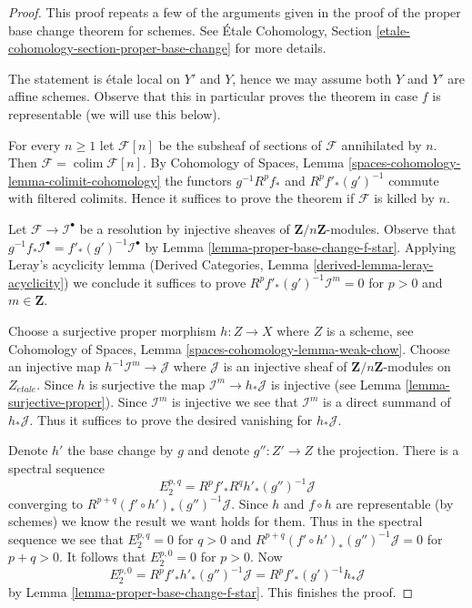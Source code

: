 \documentclass[10pt,a4paper]{amsart}
\theoremstyle{plain}
\theoremstyle{definition}
\theoremstyle{remark}
\numberwithin{equation}{subsection}
\def\colim{\mathop{\mathrm{colim}}\nolimits}
\def\etale{{\acute{e}tale}}
\begin{document}
\begin{proof}
This proof repeats a few of the arguments given in the proof of the
proper base change theorem for schemes. See
\'Etale Cohomology, Section \ref{etale-cohomology-section-proper-base-change}
for more details.

\medskip\noindent
The statement is \'etale local on $Y'$ and $Y$, hence we may assume
both $Y$ and $Y'$ are affine schemes. Observe that this in particular
proves the theorem in case $f$ is representable (we will use this
below).

\medskip\noindent
For every $n \geq 1$ let $\mathcal{F}[n]$ be the subsheaf of sections
of $\mathcal{F}$ annihilated by $n$. Then
$\mathcal{F} = \colim \mathcal{F}[n]$. By 
Cohomology of Spaces, Lemma \ref{spaces-cohomology-lemma-colimit-cohomology}
the functors $g^{-1}R^pf_*$ and $R^pf'_*(g')^{-1}$ commute
with filtered colimits. Hence it suffices to prove the theorem
if $\mathcal{F}$ is killed by $n$.

\medskip\noindent
Let $\mathcal{F} \to \mathcal{I}^\bullet$ be a resolution by
injective sheaves of $\mathbf{Z}/n\mathbf{Z}$-modules.
Observe that
$g^{-1}f_*\mathcal{I}^\bullet = f'_*(g')^{-1}\mathcal{I}^\bullet$
by Lemma \ref{lemma-proper-base-change-f-star}.
Applying Leray's acyclicity lemma
(Derived Categories, Lemma \ref{derived-lemma-leray-acyclicity})
we conclude it suffices to prove
$R^pf'_*(g')^{-1}\mathcal{I}^m = 0$ for $p > 0$ and $m \in \mathbf{Z}$.

\medskip\noindent
Choose a surjective proper morphism
$h : Z \to X$ where $Z$ is a scheme, see
Cohomology of Spaces, Lemma \ref{spaces-cohomology-lemma-weak-chow}.
Choose an injective map $h^{-1}\mathcal{I}^m \to \mathcal{J}$
where $\mathcal{J}$ is an injective sheaf of
$\mathbf{Z}/n\mathbf{Z}$-modules on $Z_\etale$.
Since $h$ is surjective the map $\mathcal{I}^m \to h_*\mathcal{J}$
is injective (see Lemma \ref{lemma-surjective-proper}).
Since $\mathcal{I}^m$ is injective we see that $\mathcal{I}^m$
is a direct summand of $h_*\mathcal{J}$. Thus it suffices
to prove the desired vanishing for $h_*\mathcal{J}$.

\medskip\noindent
Denote $h'$ the base change by $g$ and denote $g'' : Z' \to Z$
the projection. There is a spectral sequence
$$
E_2^{p, q} = R^pf'_* R^qh'_* (g'')^{-1}\mathcal{J}
$$
converging to $R^{p + q}(f' \circ h')_*(g'')^{-1}\mathcal{J}$.
Since $h$ and $f \circ h$ are representable (by schemes)
we know the result we want holds for them. Thus in the
spectral sequence we see that $E_2^{p, q} = 0$ for $q > 0$
and $R^{p + q}(f' \circ h')_*(g'')^{-1}\mathcal{J} = 0$
for $p + q > 0$. It follows that $E_2^{p, 0} = 0$ for $p > 0$.
Now
$$
E_2^{p, 0} = R^pf'_* h'_* (g'')^{-1}\mathcal{J} =
R^pf'_* (g')^{-1}h_*\mathcal{J}
$$
by Lemma \ref{lemma-proper-base-change-f-star}. This finishes the proof.
\end{proof}



\end{document}

